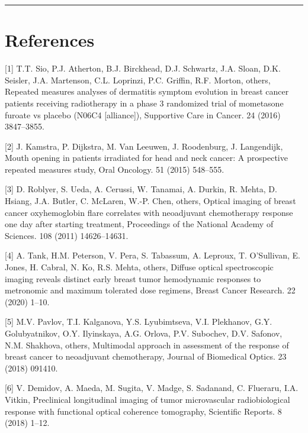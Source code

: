 \documentclass[
]{article}
\begin{document}
\begin{center}\rule{0.5\linewidth}{0.5pt}\end{center}

\hypertarget{references}{%
\section*{References}\label{references}}

\hypertarget{refs}{}
\leavevmode\hypertarget{ref-sio2016}{}%
{[}1{]} T.T. Sio, P.J. Atherton, B.J. Birckhead, D.J. Schwartz, J.A. Sloan, D.K. Seisler, J.A. Martenson, C.L. Loprinzi, P.C. Griffin, R.F. Morton, others, Repeated measures analyses of dermatitis symptom evolution in breast cancer patients receiving radiotherapy in a phase 3 randomized trial of mometasone furoate vs placebo (N06C4 {[}alliance{]}), Supportive Care in Cancer. 24 (2016) 3847--3855.

\leavevmode\hypertarget{ref-kamstra2015}{}%
{[}2{]} J. Kamstra, P. Dijkstra, M. Van Leeuwen, J. Roodenburg, J. Langendijk, Mouth opening in patients irradiated for head and neck cancer: A prospective repeated measures study, Oral Oncology. 51 (2015) 548--555.

\leavevmode\hypertarget{ref-roblyer2011}{}%
{[}3{]} D. Roblyer, S. Ueda, A. Cerussi, W. Tanamai, A. Durkin, R. Mehta, D. Hsiang, J.A. Butler, C. McLaren, W.-P. Chen, others, Optical imaging of breast cancer oxyhemoglobin flare correlates with neoadjuvant chemotherapy response one day after starting treatment, Proceedings of the National Academy of Sciences. 108 (2011) 14626--14631.

\leavevmode\hypertarget{ref-tank2020}{}%
{[}4{]} A. Tank, H.M. Peterson, V. Pera, S. Tabassum, A. Leproux, T. O'Sullivan, E. Jones, H. Cabral, N. Ko, R.S. Mehta, others, Diffuse optical spectroscopic imaging reveals distinct early breast tumor hemodynamic responses to metronomic and maximum tolerated dose regimens, Breast Cancer Research. 22 (2020) 1--10.

\leavevmode\hypertarget{ref-pavlov2018}{}%
{[}5{]} M.V. Pavlov, T.I. Kalganova, Y.S. Lyubimtseva, V.I. Plekhanov, G.Y. Golubyatnikov, O.Y. Ilyinskaya, A.G. Orlova, P.V. Subochev, D.V. Safonov, N.M. Shakhova, others, Multimodal approach in assessment of the response of breast cancer to neoadjuvant chemotherapy, Journal of Biomedical Optics. 23 (2018) 091410.

\leavevmode\hypertarget{ref-demidov2018}{}%
{[}6{]} V. Demidov, A. Maeda, M. Sugita, V. Madge, S. Sadanand, C. Flueraru, I.A. Vitkin, Preclinical longitudinal imaging of tumor microvascular radiobiological response with functional optical coherence tomography, Scientific Reports. 8 (2018) 1--12.
\end{document}
